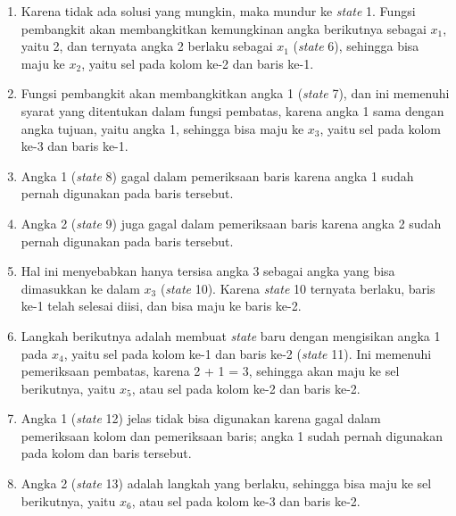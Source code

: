 \begin{enumerate}
\item Karena tidak ada solusi yang mungkin, maka mundur ke \textit{state} 1. Fungsi pembangkit akan membangkitkan kemungkinan angka berikutnya sebagai \begin{math}x_1\end{math}, yaitu 2, dan ternyata angka 2 berlaku sebagai \begin{math}x_1\end{math} (\textit{state} 6), sehingga bisa maju ke \begin{math}x_2\end{math}, yaitu sel pada kolom ke-2 dan baris ke-1.
\item Fungsi pembangkit akan membangkitkan angka 1 (\textit{state} 7), dan ini memenuhi syarat yang ditentukan dalam fungsi pembatas, karena angka 1 sama dengan angka tujuan, yaitu angka 1, sehingga bisa maju ke \begin{math}x_3\end{math}, yaitu sel pada kolom ke-3 dan baris ke-1.
\item Angka 1 (\textit{state} 8) gagal dalam pemeriksaan baris karena angka 1 sudah pernah digunakan pada baris tersebut.
\item Angka 2 (\textit{state} 9) juga gagal dalam pemeriksaan baris karena angka 2 sudah pernah digunakan pada baris tersebut.
\item Hal ini menyebabkan hanya tersisa angka 3 sebagai angka yang bisa dimasukkan ke dalam \begin{math}x_3\end{math} (\textit{state} 10). Karena \textit{state} 10 ternyata berlaku, baris ke-1 telah selesai diisi, dan bisa maju ke baris ke-2.
\item Langkah berikutnya adalah membuat \textit{state} baru dengan mengisikan angka 1 pada \begin{math}x_4\end{math}, yaitu sel pada kolom ke-1 dan baris ke-2 (\textit{state} 11). Ini memenuhi pemeriksaan pembatas, karena 2 + 1 = 3, sehingga akan maju ke sel berikutnya, yaitu \begin{math}x_5\end{math}, atau sel pada kolom ke-2 dan baris ke-2.
\item Angka 1 (\textit{state} 12) jelas tidak bisa digunakan karena gagal dalam pemeriksaan kolom dan pemeriksaan baris; angka 1 sudah pernah digunakan pada kolom dan baris tersebut.
\item Angka 2 (\textit{state} 13) adalah langkah yang berlaku, sehingga bisa maju ke sel berikutnya, yaitu \begin{math}x_6\end{math}, atau sel pada kolom ke-3 dan baris ke-2.

\end{enumerate}
